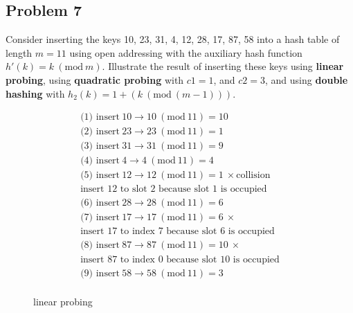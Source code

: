 \documentclass[a4paper]{article}
\newcommand{\Mod}[1]{\ (\mathrm{mod}\ #1)}
\begin{document}
\subsection*{Problem 7}
Consider inserting the keys 10, 23, 31, 4, 12, 28, 17, 87, 58 into a hash table of length $m=11$ using open addressing with the auxiliary hash function $h'(k)=k \Mod{m}$. Illustrate the result of inserting these keys using \textbf{linear probing}, using \textbf{quadratic probing} with $c1=1$, and $c2=3$, and using \textbf{double hashing} with $h_2(k)=1+(k \Mod{(m-1)})$. \\
\begin{minipage}{8cm}
\begin{align*}
  &\text{(1) insert}\ 10 \to 10 \Mod{11} = 10\\
  &\text{(2) insert}\ 23 \to 23 \Mod{11} = 1\\
  &\text{(3) insert}\ 31 \to 31 \Mod{11} = 9\\
  &\text{(4) insert}\ 4 \to 4 \Mod{11} = 4\\
  &\text{(5) insert}\ 12 \to  12 \Mod{11} = 1\ \times\text{collision} \\
  &\text{insert $12$ to slot $2$ because slot $1$ is occupied}&\\
  &\text{(6) insert}\ 28\to 28\Mod{11} = 6\\
  &\text{(7) insert}\ 17\to 17\Mod{11} = 6\ \times \\
  &\text{insert $17$ to index $7$ because slot $6$ is occupied}&\\
  &\text{(8) insert}\ 87\to 87\Mod{11} = 10\ \times \\
  &\text{insert $87$ to index $0$ because slot $10$ is occupied}&\\
  &\text{(9) insert}\ 58\to 58\Mod{11} = 3\\
\end{align*}
\end{minipage}
\qquad
\begin{minipage}{5cm}
\begin{figure}[H]
\centering
{}
\caption{linear probing}
\end{figure}
\end{minipage}
\end{document}
